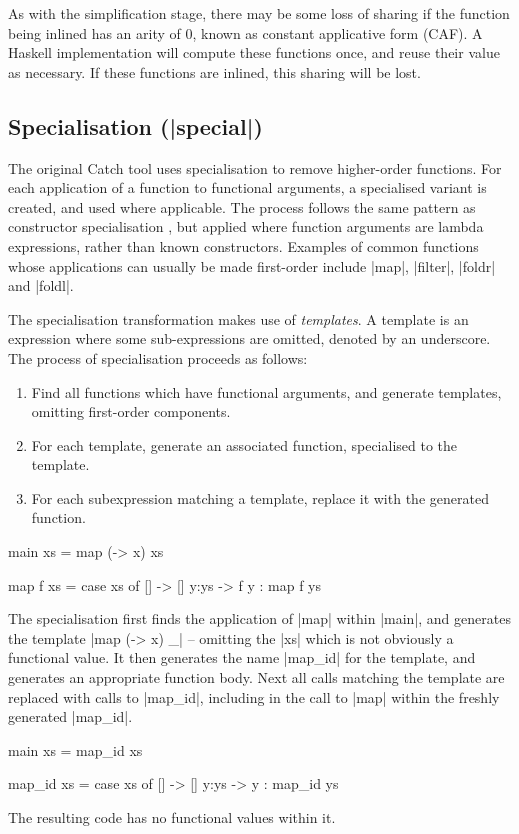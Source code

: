\documentclass[preprint]{sigplanconf}
\begin{document}
As with the simplification stage, there may be some loss of sharing if the function being inlined has an arity of 0, known as constant applicative form (CAF). A Haskell implementation will compute these functions once, and reuse their value as necessary. If these functions are inlined, this sharing will be lost.

\subsection{Specialisation (|special|)}

The original Catch tool \cite{me:catch_tfp} uses specialisation to remove higher-order functions. For each application of a function to functional arguments, a specialised variant is created, and used where applicable. The process follows the same pattern as constructor specialisation \cite{spj:specconstr}, but applied where function arguments are lambda expressions, rather than known constructors. Examples of common functions whose applications can usually be made first-order include |map|, |filter|, |foldr| and |foldl|.

The specialisation transformation makes use of \textit{templates}. A template is an expression where some sub-expressions are omitted, denoted by an underscore. The process of specialisation proceeds as follows:

\begin{enumerate}
\item Find all functions which have functional arguments, and generate templates, omitting first-order components.
\item For each template, generate an associated function, specialised to the template.
\item For each subexpression matching a template, replace it with the generated function.
\end{enumerate}

\begin{example}
\begin{code}
main xs = map (\x -> x) xs

map f xs = case  xs of
                 []    -> []
                 y:ys  -> f y : map f ys
\end{code}

The specialisation first finds the application of |map| within |main|, and generates the template |map (\x -> x) _| -- omitting the |xs| which is not obviously a functional value. It then generates the name |map_id| for the template, and generates an appropriate function body. Next all calls matching the template are replaced with calls to |map_id|, including in the call to |map| within the freshly generated |map_id|.

\begin{code}
main xs = map_id xs

map_id xs = case  xs of
                  []    -> []
                  y:ys  -> y : map_id ys
\end{code}

The resulting code has no functional values within it.
\end{example}
\end{document}
